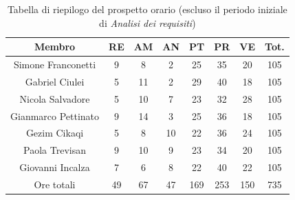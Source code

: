 \begin{table}[h]
	\caption{Tabella di riepilogo del prospetto orario (escluso il periodo iniziale di \textit{Analisi dei requisiti})} 
\begin{center}
\begin{tabular}{ |c|c|c|c|c|c|c|c|  }
 \hline
 Membro 		& RE 		& AM 		& AN 	& PT 	& PR 	& VE 	& Tot.\\
 \hline\hline
 Simone	Franconetti		& 9  	 	& 8			& 2 		& 25 		& 35 		& 20 		& 105\\
 Gabriel Ciulei		& 5 			& 11 		& 2 		& 29			& 40 		& 18 		& 105\\
 Nicola	Salvadore		& 5  		& 10 		& 7 		& 23 		& 32 		& 28 		& 105\\
 Gianmarco	Pettinato	& 9   		& 14 		& 3 		& 25		 	& 36 		& 18 		& 105\\
 Gezim	Cikaqi		& 5  		& 8  		& 10		& 22 		& 36 		& 24	 	& 105\\
 Paola	Trevisan		& 9  		& 10 		& 9 		& 23 		& 34 		& 20 		& 105\\
 Giovanni	Incalza	& 7  		& 6	 		& 8 		& 22 		& 40		 	& 22  		& 105\\
 \hline\hline
 Ore totali		& 49 	& 67		& 47 	& 169 	& 253 	& 150 	& 735\\
  \hline
\end{tabular}
\end{center}
\end{table}
